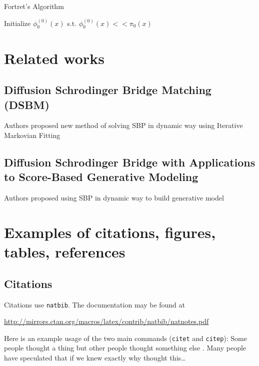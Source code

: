 \documentclass{article}
\begin{document}
\begin{algorithm}
\caption{Fortret's Algorithm}\label{alg:fortret}
Initialize $\phi_0^{(0)}(x)$ s.t. $\phi_0^{(0)}(x)<<\pi_0(x)$\;
\end{algorithm}

\section{Related works}
\label{sec:headings}
\subsection{Diffusion Schrodinger Bridge Matching (DSBM)}
Authors proposed new method of solving SBP in dynamic way using Iterative Markovian Fitting
\subsection{Diffusion Schrodinger Bridge with Applications to Score-Based Generative Modeling}
Authors proposed using SBP in dynamic way to build generative model


\section{Examples of citations, figures, tables, references}
\label{sec:others}

\subsection{Citations}
Citations use \verb+natbib+. The documentation may be found at
\begin{center}
	\url{http://mirrors.ctan.org/macros/latex/contrib/natbib/natnotes.pdf}
\end{center}

Here is an example usage of the two main commands (\verb+citet+ and \verb+citep+): Some people thought a thing \citep{kour2014real, hadash2018estimate} but other people thought something else \citep{kour2014fast}. Many people have speculated that if we knew exactly why \citet{kour2014fast} thought this\dots
\end{document}
